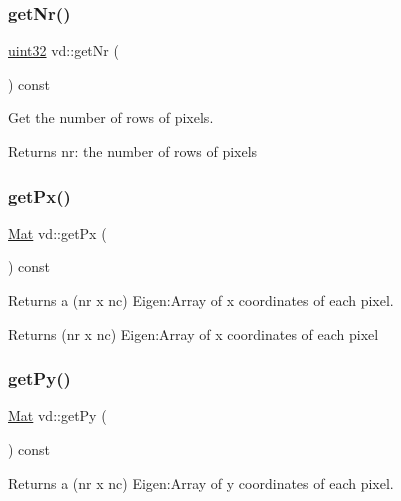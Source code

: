 \subsubsection{\texorpdfstring{get\+Nr()}{getNr()}}
{\footnotesize\ttfamily \mbox{\hyperlink{typedefs_8h_a8ad23e2333787a214e20a58a284a5a60}{uint32}} vd\+::get\+Nr (\begin{DoxyParamCaption}{ }\end{DoxyParamCaption}) const}



Get the number of rows of pixels. 

\begin{DoxyReturn}{Returns}
nr\+: the number of rows of pixels 
\end{DoxyReturn}
\mbox{\label{classvd_aeba6d318016c8f8b9537ce4c0314f8cd}} 
\subsubsection{\texorpdfstring{get\+Px()}{getPx()}}
{\footnotesize\ttfamily \mbox{\hyperlink{typedefs_8h_a9fa28c1f74e909474857584f5c7b0088}{Mat}} vd\+::get\+Px (\begin{DoxyParamCaption}{ }\end{DoxyParamCaption}) const}



Returns a (nr x nc) Eigen\+:Array of x coordinates of each pixel. 

\begin{DoxyReturn}{Returns}
(nr x nc) Eigen\+:Array of x coordinates of each pixel 
\end{DoxyReturn}
\mbox{\label{classvd_a9738711704b1d03cdbe027b1976cb0c6}} 
\subsubsection{\texorpdfstring{get\+Py()}{getPy()}}
{\footnotesize\ttfamily \mbox{\hyperlink{typedefs_8h_a9fa28c1f74e909474857584f5c7b0088}{Mat}} vd\+::get\+Py (\begin{DoxyParamCaption}{ }\end{DoxyParamCaption}) const}



Returns a (nr x nc) Eigen\+:Array of y coordinates of each pixel. 

